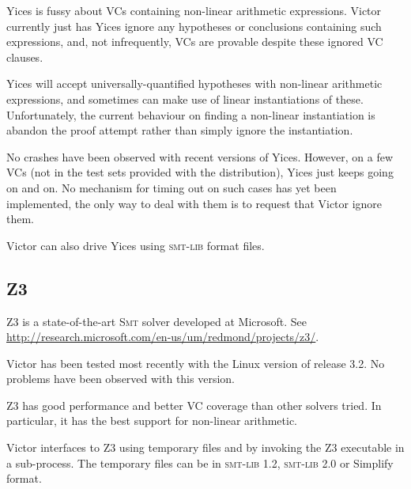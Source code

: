 \documentclass[12pt,fleqn]{article}
\newcommand{\zthree}{\textsc{Z}3}
\newcommand{\yices}{Yices}
\newcommand{\smt}{\textsc{Smt}}
\newcommand{\smtlib}{\textsc{smt-lib}}
\begin{document}
\yices{} is fussy about VCs containing non-linear arithmetic
expressions.  Victor currently just has \yices{} ignore any hypotheses
or conclusions containing such expressions, and, not infrequently, VCs
are provable despite these ignored VC clauses.  
%

\yices{} will accept universally-quantified hypotheses with non-linear
arithmetic expressions, and sometimes can make use of linear
instantiations of these.
%
Unfortunately, the current behaviour on finding a non-linear
instantiation is abandon the proof attempt rather than simply ignore
the instantiation.  

No crashes have been observed with recent versions of \yices.
However, on a few VCs (not in the test sets provided with the
distribution), \yices{} just keeps going on and on.  No mechanism for
timing out on such cases has yet been implemented, the only way to
deal with them is to request that Victor ignore them.

Victor can also drive Yices using \smtlib{} format files. 

\subsection{Z3}

\zthree{} is a state-of-the-art \smt{} solver developed at Microsoft. See
\url{http://research.microsoft.com/en-us/um/redmond/projects/z3/}.

Victor has been tested most recently with the Linux version of release
3.2.  No problems have been observed with this version.


\zthree{} has good performance and better VC coverage than other
solvers tried.  In particular, it has the best support for non-linear
arithmetic.

Victor interfaces to \zthree{} using temporary files and by invoking
the \zthree{} executable in a sub-process.  The temporary files can be
in \smtlib{} 1.2, \smtlib{} 2.0 or Simplify format.

\end{document}
